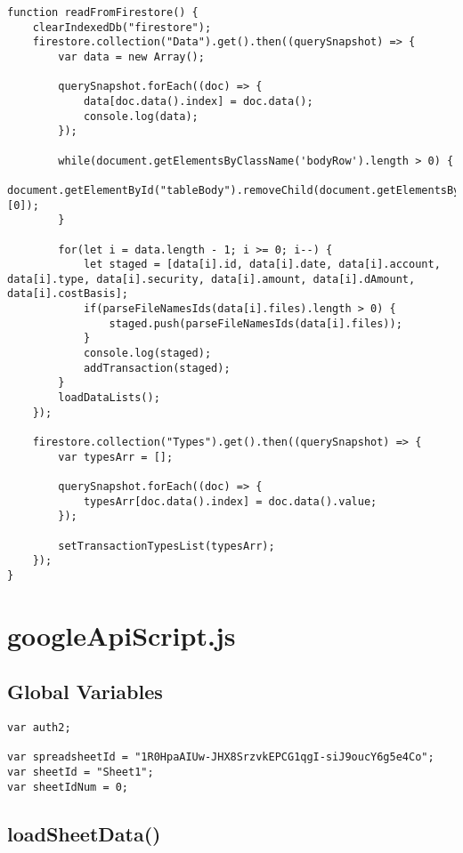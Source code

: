 \documentclass[letterpaper]{article}
\begin{document}
\begin{lstlisting}[firstnumber=126]
function readFromFirestore() {
    clearIndexedDb("firestore");
    firestore.collection("Data").get().then((querySnapshot) => {
        var data = new Array();

        querySnapshot.forEach((doc) => {
            data[doc.data().index] = doc.data();
            console.log(data);
        });

        while(document.getElementsByClassName('bodyRow').length > 0) {
            document.getElementById("tableBody").removeChild(document.getElementsByClassName('bodyRow')[0]);
        }

        for(let i = data.length - 1; i >= 0; i--) {
            let staged = [data[i].id, data[i].date, data[i].account, data[i].type, data[i].security, data[i].amount, data[i].dAmount, data[i].costBasis];
            if(parseFileNamesIds(data[i].files).length > 0) {
                staged.push(parseFileNamesIds(data[i].files));
            }
            console.log(staged);
            addTransaction(staged);
        }
        loadDataLists();
    });

    firestore.collection("Types").get().then((querySnapshot) => {
        var typesArr = [];

        querySnapshot.forEach((doc) => {
            typesArr[doc.data().index] = doc.data().value;
        });

        setTransactionTypesList(typesArr);
    });
}
\end{lstlisting}

\newpage

\section{googleApiScript.js}

\subsection{Global Variables}

\begin{lstlisting}[firstnumber=1]
var auth2;

var spreadsheetId = "1R0HpaAIUw-JHX8SrzvkEPCG1qgI-siJ9oucY6g5e4Co";
var sheetId = "Sheet1";
var sheetIdNum = 0;
\end{lstlisting}

\subsection{loadSheetData()}
\end{document}
